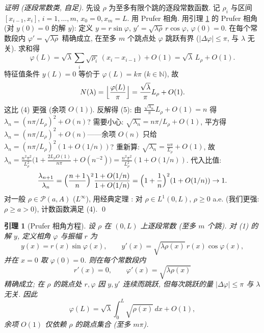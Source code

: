\documentclass[UTF8]{ctexart}
\newtheorem{lemma}[theorem]{引理}
\begin{document}
\begin{proof}[证明 (逐段常数类, 自足)]
	先设 $\rho$ 为至多有限个跳的逐段常数函数. 记 $\rho_i$ 与区间
	$[x_{i-1}, x_i]$, $i = 1, \dots, m$, $x_0 = 0, x_m = L$. 用 Prufer 相角.
	用引理 \ref{lem:prufer} 的 Prufer 相角 (对 $y(0)=0$ 的解 $y$): 定义
	$y = r\sin\varphi$, $y' = \sqrt{\lambda\rho}\,r\cos\varphi$,
	$\varphi(0) = 0$. 在每个常数段内 $\varphi' = \sqrt{\lambda\rho}$
	精确成立, 在至多 $m$ 个跳点处 $\varphi$ 跳跃有界 ($|\Delta\varphi| \le \pi$,
	与 $\lambda$ 无关). 求和得
	\[
		\varphi(L) = \sqrt\lambda \sum_i \sqrt{\rho_i}\,(x_i - x_{i-1}) + O(1)
		= \sqrt\lambda\, L_\rho + O(1).
	\]
	特征值条件 $y(L) = 0$ 等价于 $\varphi(L) = k\pi$ ($k \in \mathbb N$),
	故
	\[
		N(\lambda) = \Bigl\lfloor \frac{\varphi(L)}{\pi}\Bigr\rfloor
		= \frac{\sqrt\lambda}{\pi} L_\rho + O(1).
	\]
	这比 (4) 更强 (余项 $O(1)$). 反解得 (5): 由
	$\frac{\sqrt{\lambda_n}}{\pi} L_\rho + O(1) = n$ 得
	$\lambda_n = (n\pi/L_\rho)^2 + O(n)$? 需要小心:
	$\sqrt{\lambda_n} = n\pi/L_\rho + O(1)$, 平方得
	$\lambda_n = (n\pi/L_\rho)^2 + O(n)$——余项 $O(n)$ 只给
	$\lambda_n = (n\pi/L_\rho)^2(1+O(1/n))$? 重新算:
	$\sqrt{\lambda_n} = \frac{n\pi}{L_\rho} + O(1)$,
	故 $\lambda_n = \frac{n^2\pi^2}{L_\rho^2}\bigl(1 + \frac{2L_\rho O(1)}{n\pi}
	+ O(n^{-2})\bigr) = \frac{n^2\pi^2}{L_\rho^2}(1 + O(1/n))$.
	代入比值:
	\[
		\frac{\lambda_{n+1}}{\lambda_n}
		= \Bigl(\frac{n+1}{n}\Bigr)^2 \frac{1+O(1/n)}{1+O(1/n)}
		= \Bigl(1 + \frac{1}{n}\Bigr)^2 (1+O(1/n)) \to 1.
	\]
	对一般 $\rho \in \mathcal P(a,A)$ ($L^\infty$), 用经典定理 \cite{am1987}:
	对 $\rho \in L^1(0,L)$, $\rho \ge 0$ a.e. (我们更强: $\rho \ge a > 0$),
	计数函数满足 (4). \qed
\end{proof}

\begin{lemma}[Prufer 相角方程]\label{lem:prufer}
	设 $\rho$ 在 $(0,L)$ 上逐段常数 (至多 $m$ 个跳). 对 (1) 的解 $y$,
	定义相角 $\varphi$ 与振幅 $r$ 为
	\[
		y(x) = r(x)\sin\varphi(x), \qquad
		y'(x) = \sqrt{\lambda\rho(x)}\, r(x)\cos\varphi(x),
	\]
	并在 $x = 0$ 取 $\varphi(0) = 0$. 则在每个常数段内
	\[
		r'(x) = 0, \qquad \varphi'(x) = \sqrt{\lambda\rho(x)}
	\]
	精确成立; 在 $\rho$ 的跳点处 $r, \varphi$ 因 $y, y'$ 连续而跳跃,
	但每次跳跃的量 $|\Delta\varphi| \le \pi$ 与 $\lambda$ 无关.
	因此
	\[
		\varphi(L) = \sqrt\lambda \int_0^L \sqrt{\rho(x)}\,dx + O(1),
	\]
	余项 $O(1)$ 仅依赖 $\rho$ 的跳点集合 (至多 $m\pi$).
\end{lemma}
\end{document}
